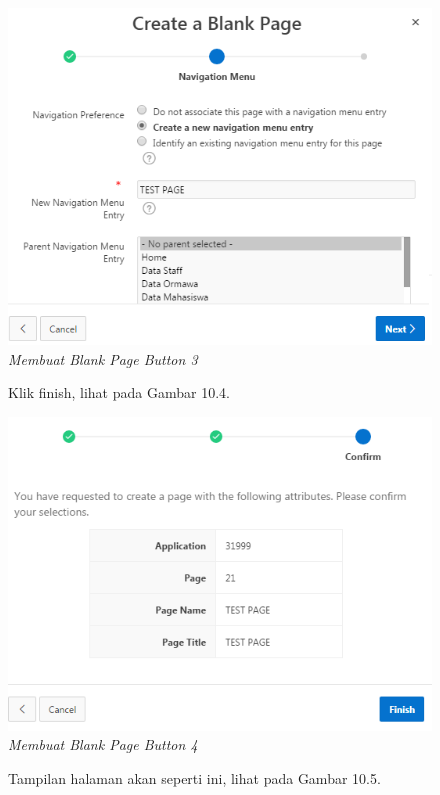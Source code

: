 \begin{enumerate}
\begin{figure}
        \centering
        \includegraphics[scale=0.55]{figures/bab10/3.png}
        \caption{\textit{Membuat Blank Page Button 3}}
        \label{Membuat Blank Page 3}
    \end{figure}
    \begin{figure}
	\item Klik finish, lihat pada Gambar 10.4.
	
        \centering
        \includegraphics[scale=0.5]{figures/bab10/4.png}
        \caption{\textit{Membuat Blank Page Button 4}}
        \label{Membuat Blank Page 4}
    \end{figure}
	\begin{figure}
	\item Tampilan halaman akan seperti ini, lihat pada Gambar 10.5.
	

\end{figure}
\end{enumerate}
